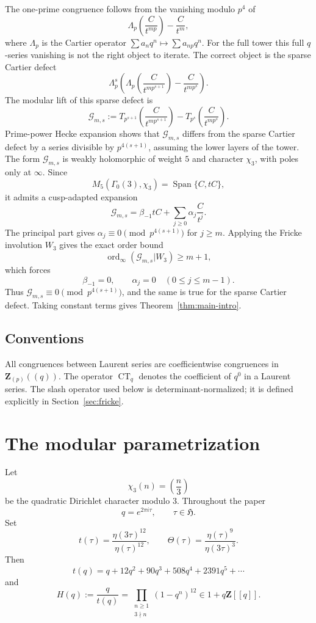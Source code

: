 \documentclass[11pt]{amsart}
\theoremstyle{remark}
\DeclareMathOperator{\ord}{ord}
\DeclareMathOperator{\CT}{CT}
\DeclareMathOperator{\Span}{Span}
\newcommand{\Z}{\mathbf Z}
\newcommand{\HH}{\mathfrak H}
\newcommand{\Up}{\Lambda_p}
\begin{document}
The one-prime congruence follows from the vanishing modulo $p^4$ of
\[
 \Up\left(\frac{C}{t^{mp}}\right)-\frac{C}{t^m},
\]
where $\Up$ is the Cartier operator $\sum a_nq^n\mapsto \sum a_{np}q^n$.  For the full tower this full $q$-series vanishing is not the right object to iterate.  The correct object is the sparse Cartier defect
\[
 \Up^s\left(
 \Up\left(\frac{C}{t^{mp^{s+1}}}\right)-\frac{C}{t^{mp^s}}
 \right).
\]
The modular lift of this sparse defect is
\[
 \mathcal G_{m,s}:=
 T_{p^{s+1}}\left(\frac{C}{t^{mp^{s+1}}}\right)
 -T_{p^s}\left(\frac{C}{t^{mp^s}}\right).
\]
Prime-power Hecke expansion shows that $\mathcal G_{m,s}$ differs from the sparse Cartier defect by a series divisible by $p^{4(s+1)}$, assuming the lower layers of the tower.  The form $\mathcal G_{m,s}$ is weakly holomorphic of weight $5$ and character $\chi_3$, with poles only at $\infty$.  Since
\[
 M_5(\Gamma_0(3),\chi_3)=\Span\{C,tC\},
\]
it admits a cusp-adapted expansion
\[
 \mathcal G_{m,s}=\beta_{-1}tC+\sum_{j\ge0}\alpha_j\frac{C}{t^j}.
\]
The principal part gives $\alpha_j\equiv0\pmod {p^{4(s+1)}}$ for $j\ge m$.  Applying the Fricke involution $W_3$ gives the exact order bound
\[
 \ord_\infty(\mathcal G_{m,s}|W_3)\ge m+1,
\]
which forces
\[
 \beta_{-1}=0,
 \qquad
 \alpha_j=0\quad(0\le j\le m-1).
\]
Thus $\mathcal G_{m,s}\equiv0\pmod {p^{4(s+1)}}$, and the same is true for the sparse Cartier defect.  Taking constant terms gives Theorem~\ref{thm:main-intro}.

\subsection*{Conventions}
All congruences between Laurent series are coefficientwise congruences in $\Z_{(p)}((q))$.  The operator $\CT_q$ denotes the coefficient of $q^0$ in a Laurent series.  The slash operator used below is determinant-normalized; it is defined explicitly in Section~\ref{sec:fricke}.

\section{The modular parametrization}\label{sec:modular}

Let
\[
 \chi_3(n)=\left(\frac n3\right)
\]
be the quadratic Dirichlet character modulo $3$.
Throughout the paper
\[
 q=e^{2\pi i\tau},\qquad \tau\in\HH.
\]
Set
\[
 t(\tau)=\frac{\eta(3\tau)^{12}}{\eta(\tau)^{12}},
 \qquad
 \Theta(\tau)=\frac{\eta(\tau)^9}{\eta(3\tau)^3}.
\]
Then
\[
 t(q)=q+12q^2+90q^3+508q^4+2391q^5+\cdots
\]
and
\[
 H(q):=\frac{q}{t(q)}=
 \prod_{\substack{n\ge1\\3\nmid n}}(1-q^n)^{12}
 \in 1+q\Z[[q]].
\]
\end{document}
